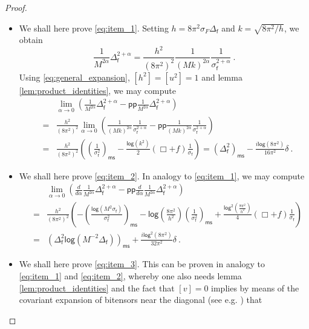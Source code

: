\documentclass[11pt]{book}
\newcommand{\pp}{\mathsf{pp}}
\newcommand{\ms}{\mathsf{ms}}
\renewcommand{\log}{\mathsf{log}}
\newcommand{\fsf}{\mathsf{f}}
\theoremstyle{break}
\begin{document}
\begin{proof}
\begin{itemize}
\item We shall here prove \ref{eq:item_1}. Setting $h=8\pi^2\sigma_F \Delta_\fsf$ and $k=\sqrt{8\pi^2/h}$, we obtain
%
\begin{equation*}
\frac{1}{M^{2\alpha}} \Delta_\fsf^{2+\alpha} = \frac{h^2}{(8\pi^2)^2} \frac{1}{(Mk)^{2\alpha}} \frac{1}{\sigma_\fsf^{2+\alpha}} \ . 
\end{equation*}
%
Using \eqref{eq:general_expansion}, $[h^2]=[u^2]=1$ and lemma \ref{lem:product_identities}, we may compute
%
\begin{eqnarray*}
&& \lim_{\alpha\to 0} \left(\frac{1}{M^{2\alpha}} \Delta_\fsf^{2+\alpha} - \pp\frac{1}{M^{2\alpha}} \Delta_\fsf^{2+\alpha} \right) \\
%
&=& \frac{h^2}{(8\pi^2)^2} \lim_{\alpha\to 0} \left(\frac{1}{(Mk)^{2\alpha}} \frac{1}{\sigma_\fsf^{2+\alpha}} - \pp\frac{1}{(Mk)^{2\alpha}} \frac{1}{\sigma_\fsf^{2+\alpha}} \right) \\
%
&=& \frac{h^2}{(8\pi^2)^2} \left(\left(\frac{1}{\sigma^2_\fsf}\right)_\ms - \frac{\log (k^2)}{2} \left(\Box + f\right) \frac{1}{\sigma_\fsf}\right) = (\Delta^2_\fsf)_\ms - \frac{i\log(8\pi^2)}{16\pi^2} \delta \ . 
\end{eqnarray*}
%
%
%
%
\item We shall here prove \ref{eq:item_2}. In analogy to \ref{eq:item_1}, we may compute
%
\begin{eqnarray*}
&& \lim_{\alpha\to 0} \left(\frac{d}{d\alpha} \frac{1}{M^{2\alpha}} \Delta_\fsf^{2+\alpha} - \pp\frac{d}{d\alpha} \frac{1}{M^{2\alpha}} \Delta_\fsf^{2+\alpha} \right) \\
%
&=& \frac{h^2}{(8\pi^2)^2} \left(-\left(\frac{\log \left(M^2 \sigma_\fsf\right)}{\sigma^2_\fsf}\right)_\ms - \log\left(\frac{8\pi^2}{h^2}\right) \left(\frac{1}{\sigma^2_\fsf}\right)_\ms + \frac{\log^2 \left(\frac{8\pi^2}{h^2}\right)}{4}\left(\Box + f\right)\frac{1}{\sigma_\fsf}\right) \\
%
&=& \left(\Delta^2_\fsf \log \left(M^{-2}\Delta_\fsf \right)\right)_\ms + \frac{i\log^2(8\pi^2)}{32\pi^2} \delta \ . 
\end{eqnarray*}
%
%
%
%
\item We shall here prove \ref{eq:item_3}. This can be proven in analogy to \ref{eq:item_1} and \ref{eq:item_2}, whereby one also needs lemma \ref{lem:product_identities} and the fact that $[v]=0$ implies by means of the covariant expansion of bitensors near the diagonal (see e.g. \cite[Section 5]{poisson_motion_2011}) that 

\end{itemize}
\end{proof}
\end{document}
